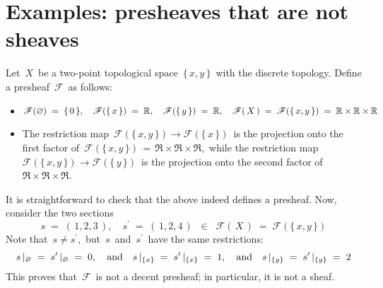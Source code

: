 

\section{Examples: presheaves that are not sheaves}


\renewcommand{\theenumi}{\roman{enumi}}
\renewcommand{\labelenumi}{\textnormal{(\theenumi)}$\;\;$}


\begin{example}
\mbox{}\vskip 0.1cm
\noindent
Let \,$X$\, be a two-point topological space \,$\{\,x,y\,\}$\, with the discrete topology.
Define a presheaf \,$\mathscr{F}$\, as follows:
\begin{itemize}
\item
	$
	\mathscr{F}(\varnothing) \;=\; \{\,0\,\},
	\quad
	\mathscr{F}(\{\,x\,\}) \;=\; \mathbb{R},
	\quad
	\mathscr{F}(\{\,y\,\}) \;=\; \mathbb{R},
	\quad
	\mathscr{F}(\,X\,) \;=\; \mathscr{F}(\{\,x,y\,\}) \;=\; \mathbb{R} \times \mathbb{R} \times \mathbb{R}
	$
\item
	The restriction map
	\,$\mathscr{F}(\{\,x,y\,\}) \longrightarrow \mathscr{F}(\{\,x\,\})$\,
	is the projection onto the first factor of
	\,$\mathscr{F}(\{\,x,y\,\}) \,=\, \Re \times \Re \times \Re$,\,
	while the restriction map
	\,$\mathscr{F}(\{\,x,y\,\}) \longrightarrow \mathscr{F}(\{\,y\,\})$\,
	is the projection onto the second factor of \,$\Re \times \Re \times \Re$.\,
\end{itemize}
It is straightforward to check that the above indeed defines a presheaf.
Now, consider the two sections
\begin{equation*}
s \;=\; (\,1,2,3\,), \quad s^{\prime} \;=\; (\,1,2,4\,) \;\;\in\;\; \mathscr{F}(\,X\,) \;=\; \mathscr{F}(\{\,x,y\,\})
\end{equation*}
Note that \,$s \neq s^{\prime}$,\, but \,$s$\, and \,$s^{\prime}$\, have the same restrictions:
\begin{equation*}
s\,\vert_{\varnothing} \;=\; s^{\prime}\,\vert_{\varnothing} \;=\; 0,
\quad\textnormal{and}\quad
s\,\vert_{\{x\}} \;=\; s^{\prime}\,\vert_{\{x\}} \;=\; 1,
\quad\textnormal{and}\quad
s\,\vert_{\{y\}} \;=\; s^{\prime}\,\vert_{\{y\}} \;=\; 2
\end{equation*}
This proves that \,$\mathscr{F}$\, is not a decent presheaf; in particular, it is not a sheaf.
\end{example}

